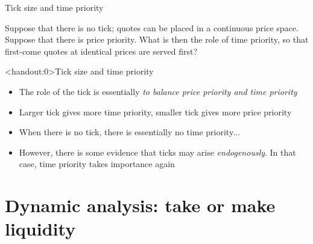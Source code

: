 \documentclass[english,10pt
,aspectratio=169
]{beamer}
\begin{document}
\begin{frame}{Tick size and time priority}
	\begin{exampleblock}{}
		Suppose that there is no tick; quotes can  be placed in a continuous price space. Suppose that there is price priority. What is then the role of time priority, so that first-come quotes at identical prices are served first?
	\end{exampleblock}
	
\end{frame}


\begin{frame}<handout:0>{Tick size and time priority}
	\begin{itemize}
		\item The role of the tick is essentially \textit{to balance price priority and time priority}
		\item Larger tick gives more time priority, smaller tick gives more price priority
		\item When there is no tick, there is essentially no time priority...
		\item However, there is some evidence that ticks may arise \textit{endogenously}. In that case, time priority takes importance again
	\end{itemize}
\end{frame}





\section{Dynamic analysis: take or make liquidity}
\end{document}

